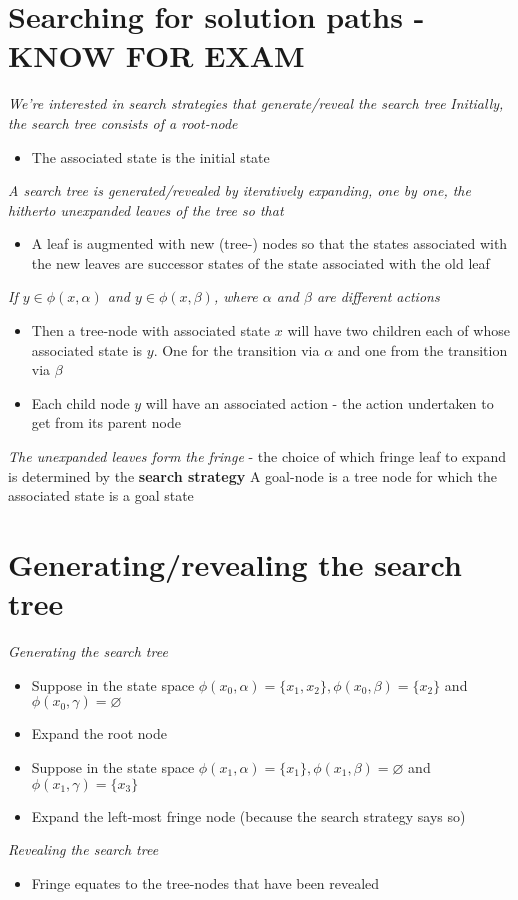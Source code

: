 \documentclass{article}[18pt]
\begin{document}
\section{Searching for solution paths - KNOW FOR EXAM}
\textit{We're interested in search strategies that generate/reveal the search tree}
\textit{Initially, the search tree consists of a root-node}
\begin{itemize}
	\item The associated state is the initial state
\end{itemize}
\textit{A search tree is generated/revealed by iteratively expanding, one by one, the hitherto unexpanded leaves of the tree so that}
\begin{itemize}
	\item A leaf is augmented with new (tree-) nodes so that the states associated with the new leaves are successor states of the state associated with the old leaf
\end{itemize}
\textit{If $y\in \phi(x,\alpha)$ and $y\in \phi(x,\beta)$, where $\alpha$ and $\beta$ are different actions}
\begin{itemize}
	\item Then a tree-node with associated state $x$ will have two children each of whose associated state is $y$. One for the transition via $\alpha$ and one from the transition via $\beta$
	\item Each child node $y$ will have an associated action - the action undertaken to get from its parent node 
\end{itemize}
\textit{The unexpanded leaves form the fringe} - the choice of which fringe leaf to expand is determined by the \textbf{search strategy}
A goal-node is a tree node for which the associated state is a goal state
\section{Generating/revealing the search tree}
\textit{Generating the search tree}
\begin{itemize}
	\item Suppose in the state space $\phi(x_0,\alpha)=\{x_1,x_2\},\phi(x_0,\beta)=\{x_2\}$ and $\phi(x_0,\gamma)=\varnothing$
	\item Expand the root node
	\item Suppose in the state space $\phi(x_1,\alpha)=\{x_1\},\phi(x_1,\beta)=\varnothing$ and $\phi(x_1,\gamma)=\{x_3\}$
	\item Expand the left-most fringe node (because the search strategy says so)
\end{itemize}
\textit{Revealing the search tree}
\begin{itemize}
	\item Fringe equates to the tree-nodes that have been revealed
\end{itemize}
\end{document}

